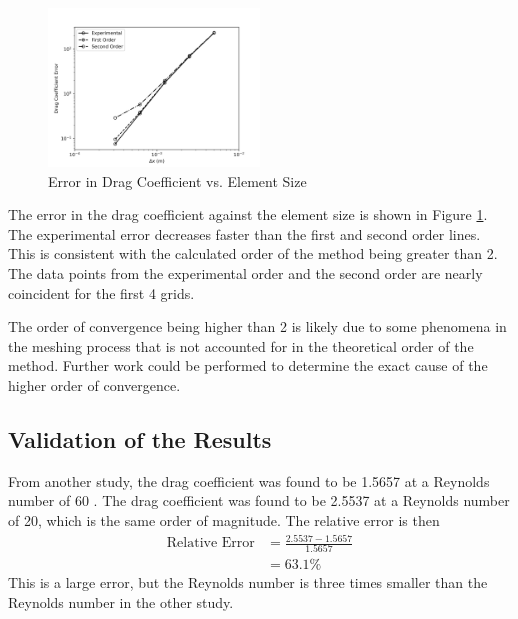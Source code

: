 \begin{figure}[H]
    \centering
    \includegraphics[width=0.5\textwidth]{Questions/Figures/richardson_error_vs_element_size.png}
    \caption{Error in Drag Coefficient vs. Element Size}
    \label{fig:richardson_error_vs_element_size}
\end{figure}
The error in the drag coefficient against the element size is shown in Figure \ref{fig:richardson_error_vs_element_size}. The experimental error decreases faster than the first and second order lines. This is consistent with the calculated order of the method being greater than 2. The data points from the experimental order and the second order are nearly coincident for the first 4 grids. 

The order of convergence being higher than 2 is likely due to some phenomena in the meshing process that is not accounted for in the theoretical order of the method. Further work could be performed to determine the exact cause of the higher order of convergence.

\subsection{Validation of the Results}
From another study, the drag coefficient was found to be 1.5657 at a Reynolds number of 60 \cite{paper}. The drag coefficient was found to be 2.5537 at a Reynolds number of 20, which is the same order of magnitude. The relative error is then
\begin{align*}
    \text{Relative Error} &= \frac{2.5537 - 1.5657}{1.5657} \\
    &= \boxed{63.1\%}
\end{align*}
This is a large error, but the Reynolds number is three times smaller than the Reynolds number in the other study. 

